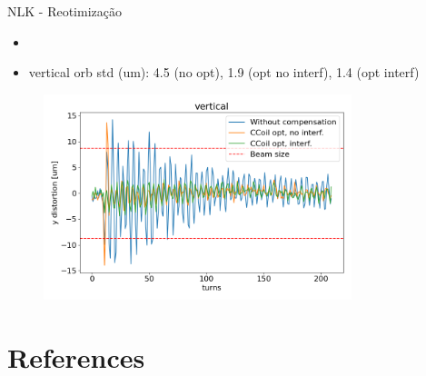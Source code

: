 \documentclass[aspectratio=169]{beamer}					  %
\begin{document}
\begin{frame}{NLK - Reotimização}
    \scriptsize{\begin{itemize}
    		\item \href{https://ais-eng-srv-ta.cnpem.br/Olog/\#20923_4}{}
            \item vertical orb std (um): 4.5 (no opt), 1.9 (opt no interf),  1.4 (opt interf)
    \end{itemize}}
    \begin{figure}[H]
        	\centering
            \includegraphics[width=0.8\textwidth]{2023-12-12/figures/vertical_nlk_distortion_interference.png}
            \label{fig:bba}
    \end{figure} 
\end{frame}

\section{References}
\end{document}
